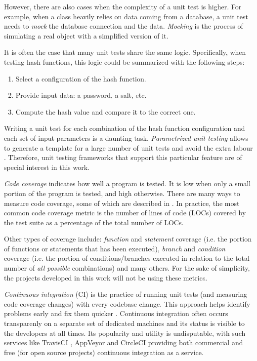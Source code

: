 However, there are also cases when the complexity of a unit test is higher. For example, when a class heavily relies on data coming from a database, a unit test needs to \emph{mock} the database connection and the data. \emph{Mocking} is the process of simulating a real object with a simplified version of it.

It is often the case that many unit tests share the same logic. Specifically, when testing hash functions, this logic could be summarized with the following steps:

\begin{enumerate}
    \item Select a configuration of the hash function.
    \item Provide input data: a password, a salt, etc.
    \item Compute the hash value and compare it to the correct one.
   \end{enumerate}

Writing a unit test for each combination of the hash function configuration and each set of input parameters is a daunting task. \emph{Parametrized unit testing} allows to generate a template for a large number of unit tests and avoid the extra labour \cite{tillmann:2010:parametrized-unit-tests-rock}. Therefore, unit testing frameworks that support this particular feature are of special interest in this work.

\emph{Code coverage} indicates how well a program is tested. It is low when only a small portion of the program is tested, and high otherwise. There are many ways to measure code coverage, some of which are described in \cite{elberzhager:2012:reducing-effort}. In practice, the most common code coverage metric is the number of lines of code (LOCs) covered by the test suite as a percentage of the total number of LOCs.

Other types of coverage include: \emph{function} and \emph{statement} coverage (i.e. the portion of functions or statements that has been executed), \emph{branch} and \emph{condition} coverage (i.e. the portion of conditions/branches executed in relation to the total number of \emph{all possible} combinations) and many others. For the sake of simplicity, the projects developed in this work will not be using these metrics.

\emph{Continuous integration} (CI) is the practice of running unit tests (and measuring code coverage changes) with every codebase change. This approach helps identify problems early and fix them quicker \cite{williams:2010:unit-tests-rock}. Continuous integration often occurs transparenly on a separate set of dedicated machines and its status is visible to the developers at all times. Its popularity and utility is undisputable, with such services like TravisCI \cite{travis:2017:homepage}, AppVeyor \cite{appveyor:2017:homepage} and CircleCI \cite{circleci:2017:homepage} providing both commercial and free (for open source projects) continuous integration as a service.

